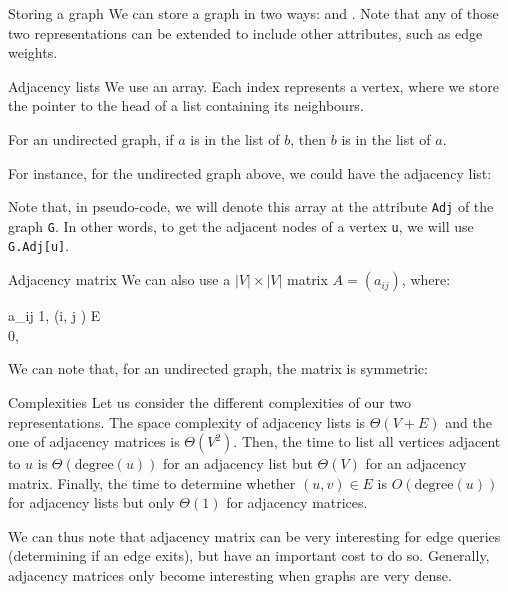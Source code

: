 \documentclass[a4paper]{article}
\begin{document}
\begin{parag}{Storing a graph}
    We can store a graph in two ways:  and . Note that any of those two representations can be extended to include other attributes, such as edge weights.

    \begin{subparag}{Adjacency lists}
        We use an array. Each index represents a vertex, where we store the pointer to the head of a list containing its neighbours. 

        For an undirected graph, if $a$ is in the list of $b$, then $b$ is in the list of $a$.

        For instance, for the undirected graph above, we could have the adjacency list:

        Note that, in pseudo-code, we will denote this array at the attribute \texttt{Adj} of the graph \texttt{G}. In other words, to get the adjacent nodes of a vertex \texttt{u}, we will use \texttt{G.Adj[u]}.
    \end{subparag}

    \begin{subparag}{Adjacency matrix}
        We can also use a $\left|V\right| \times \left|V\right|$ matrix $A = \left(a_{ij}\right)$, where: 
        \begin{functionbypart}{a_{ij}}
        1, \mathspace {} \left(i, j \right) \in E \\
        0, \mathspace {}
        \end{functionbypart}

        We can note that, for an undirected graph, the matrix is symmetric:
    \end{subparag}

    \begin{subparag}{Complexities}
        Let us consider the different complexities of our two representations. The space complexity of adjacency lists is $\Theta\left(V + E\right)$ and the one of adjacency matrices is $\Theta\left(V^2\right)$. Then, the time to list all vertices adjacent to $u$ is $\Theta\left(\text{degree}\left(u\right)\right)$ for an adjacency list but $\Theta\left(V\right)$ for an adjacency matrix. Finally, the time to determine whether $\left(u, v\right) \in E$ is $O\left(\text{degree}\left(u\right)\right)$  for adjacency lists but only $\Theta\left(1\right)$ for adjacency matrices.
        
        We can thus note that adjacency matrix can be very interesting for edge queries (determining if an edge exits), but have an important cost to do so. Generally, adjacency matrices only become interesting when graphs are very dense.
    \end{subparag}
\end{parag}
\end{document}
